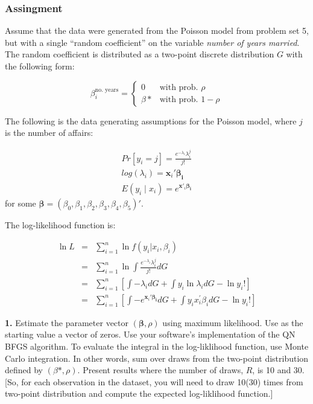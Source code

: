 \documentclass[10pt]{article}
\newcommand{\bs}{\boldsymbol}
\begin{document}
\subsubsection*{Assingment} %
\label{ssub:assingment}

 
Assume that the data were generated from the Poisson model from problem set 5, but with a single ``random coefficient'' on the variable \emph{number of years married}. The random coefficient is distributed as a two-point discrete distribution $G$ with the following form:

$$
\beta_i^{\text{no. years}} = 
\begin{cases}
0 & \text{with prob.}\,\, \rho \\
\beta* & \text{with prob.}\,\, 1-\rho
\end{cases}
$$
 


 The following is the data generating assumptions for the Poisson model, where $j$ is the number of affairs:

 \begin{align}
 	Pr[y_i=j] = \frac{e^{-\lambda_i}\lambda_i^j}{j!}\\
 	log(\lambda_i) = \bs{x}_i'\bs{\beta_i} \\
 	E(y_i\mid x_i) = e^{\bs{x}'_i\bs{\beta_i}}
 \end{align}
 for some $\bs{\beta} = (\beta_0,\beta_1,\beta_2,\beta_3,\beta_4,\beta_5)'$.

The log-likelihood function is: 

\begin{eqnarray*}
\ln L &=&\sum\limits_{i=1}^{n}\ln f\left( y_{i}\left\vert x_{i}\right.
,\beta_i \right) \\
&=&\sum\limits_{i=1}^{n}\ln \int \frac{e^{-\lambda _{i}}\lambda _{i}^{j}}{j!} dG\\
&=&\sum\limits_{i=1}^{n}\left[ \int-\lambda_{i}dG + \int y_{i}\ln \lambda _{i}dG - \ln y_i!%
\right] \\
&=&\sum\limits_{i=1}^{n}\left[ \int-e^{\mathbf{x}_{i}\prime \mathbf{\beta_i }%
} dG + \int y_{i}x_{i}^{\prime }\beta_i dG -\ln y_{i}!\right]
\end{eqnarray*}




\noindent \textbf{1.} Estimate the parameter vector $(\bs{\beta},\rho)$ using maximum likelihood. Use as the starting value a vector of zeros. Use your software's implementation of the QN BFGS algorithm. To evaluate the integral in the log-liklihood function, use Monte Carlo integration. In other words, sum over draws from the two-point distribution defined by $(\beta*,\rho)$. Present results where the number of draws, $R$, is 10 and 30. [So, for each observation in the dataset, you will need to draw 10(30) times from two-point distribution and compute the expected log-liklihood function.]
\end{document}
